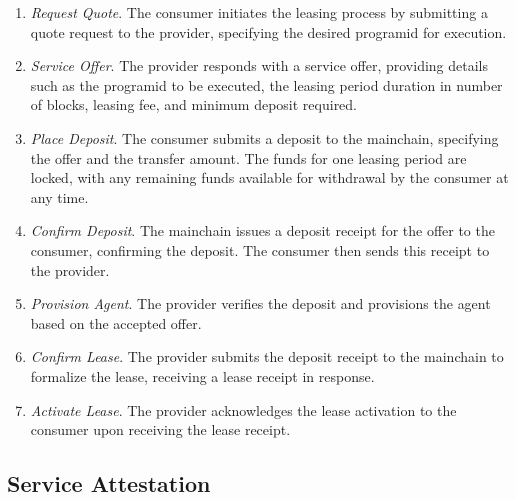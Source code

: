 \documentclass{oc}
\begin{document}
\begin{enumerate}
  \item \emph{Request Quote}. The \gls{consumer} initiates the leasing process by submitting a quote request to the \gls{provider}, specifying the desired \gls{programid} for execution.
  
  \item \emph{Service Offer}. The \gls{provider} responds with a service offer, providing details such as the \gls{programid} to be executed, the leasing period duration in number of blocks, leasing fee, and minimum deposit required.
  
  \item \emph{Place Deposit}. The \gls{consumer} submits a deposit to the \gls{mainchain}, specifying the offer and the transfer amount. The funds for one leasing period are locked, with any remaining funds available for withdrawal by the consumer at any time.
  
  \item \emph{Confirm Deposit}. The \gls{mainchain} issues a deposit receipt for the offer to the \gls{consumer}, confirming the deposit. The \gls{consumer} then sends this receipt to the \gls{provider}.
  
  \item \emph{Provision Agent}. The \gls{provider} verifies the deposit and provisions the \gls{agent} based on the accepted offer.
  
  \item \emph{Confirm Lease}. The \gls{provider} submits the deposit receipt to the \gls{mainchain} to formalize the lease, receiving a lease receipt in response.
  
  \item \emph{Activate Lease}. The \gls{provider} acknowledges the lease activation to the \gls{consumer} upon receiving the lease receipt.
\end{enumerate}

\subsection{Service Attestation}\label{sec:service-attestation}
\end{document}
